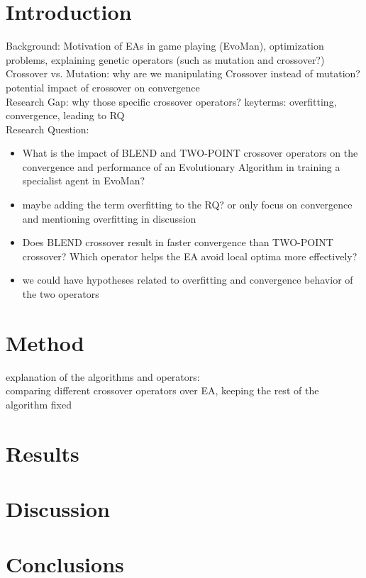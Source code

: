 
\section{Introduction}
Background: Motivation of EAs in game playing (EvoMan), optimization problems, explaining genetic operators (such as mutation and crossover?) \\

Crossover vs. Mutation: why are we manipulating Crossover instead of mutation? potential impact of crossover on convergence \\

Research Gap: why those specific crossover operators? keyterms: overfitting, convergence, leading to RQ \\

Research Question:
\begin{itemize}
 	\item What is the impact of BLEND and TWO-POINT crossover operators on the convergence and performance of an Evolutionary Algorithm in training a specialist agent in EvoMan?
 	\item maybe adding the term overfitting to the RQ? or only focus on convergence and mentioning overfitting in discussion
	\item Does BLEND crossover result in faster convergence than TWO-POINT crossover? Which operator helps the EA avoid local optima more effectively?
	\item we could have hypotheses related to overfitting and convergence behavior of the two operators
\end{itemize}

\section{Method}
explanation of the algorithms and operators: \\
comparing different crossover operators over EA, keeping the rest of the algorithm fixed

\section{Results}

\section{Discussion}

\cite{de2016evolving}

\section{Conclusions}

